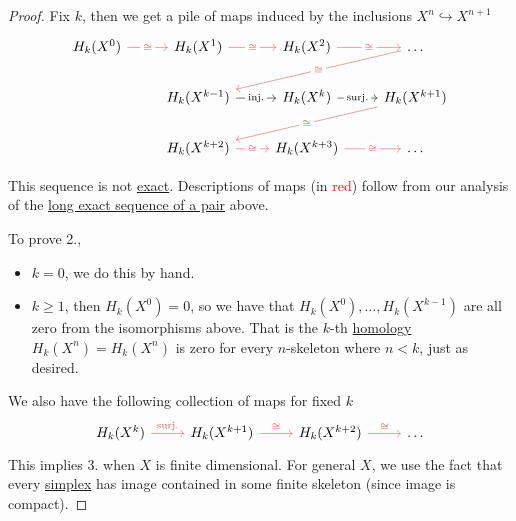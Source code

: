 \begin{proof}
	Fix \(k\), then we get a pile of maps induced by the inclusions \(X^n \hookrightarrow X^{n + 1}\)
	\[
		\begin{tikzcd}
			{H_k(X^0)} & {H_k(X^1)} & {H_k(X^2)} & \ldots \\
			& {H_k(X^{k-1})} & {H_k(X^{k})} & {H_k(X^{k+1})} \\
			& {H_k(X^{k+2})} & {H_k(X^{k+3})} & \ldots
			\arrow["\cong"{description}, color={rgb,255:red,214;green,92;blue,92}, from=1-4, to=2-2]
			\arrow["{\text{inj.}}"{description}, from=2-2, to=2-3]
			\arrow["{\text{surj.}}"{description}, from=2-3, to=2-4]
			\arrow["\cong"{description}, color={rgb,255:red,214;green,92;blue,92}, from=2-4, to=3-2]
			\arrow["\cong"{description}, color={rgb,255:red,214;green,92;blue,92}, from=3-2, to=3-3]
			\arrow["\cong"{description}, color={rgb,255:red,214;green,92;blue,92}, from=3-3, to=3-4]
			\arrow["\cong"{description}, color={rgb,255:red,214;green,92;blue,92}, from=1-1, to=1-2]
			\arrow["\cong"{description}, color={rgb,255:red,214;green,92;blue,92}, from=1-2, to=1-3]
			\arrow["\cong"{description}, color={rgb,255:red,214;green,92;blue,92}, from=1-3, to=1-4]
		\end{tikzcd}
	\]
	\begin{note}
		This sequence is not \hyperref[def:exact-sequence]{exact}. Descriptions of maps (in \textcolor{red}{red}) follow
		from our analysis of the \hyperref[thm:long-exact-sequence-of-a-pair]{long exact sequence of a pair} above.
	\end{note}

	To prove 2.,
	\begin{itemize}
		\item \(k = 0\), we do this by hand.
		\item \(k \geq 1\), then \(H_k(X^0) = 0\), so we have that \(H_k(X^0), \ldots, H_k(X^{k - 1})\) are all zero from the
		      isomorphisms above. That is the \(k\)-th \hyperref[def:singular-homology-group]{homology} \(H_k(X^n) = H_k(X^n)\)
		      is zero for every \(n\)-skeleton where \(n < k\), just as desired.
	\end{itemize}
	We also have the following collection of maps for fixed \(k\)
	\[
		\begin{tikzcd}
			{H_k(X^k)} & {H_k(X^{k+1})} & {H_k(X^{k+2})} & \ldots
			\arrow["{\text{surj.}}", color={rgb,255:red,214;green,92;blue,92}, from=1-1, to=1-2]
			\arrow["\cong", color={rgb,255:red,214;green,92;blue,92}, from=1-2, to=1-3]
			\arrow["\cong", color={rgb,255:red,214;green,92;blue,92}, from=1-3, to=1-4]
		\end{tikzcd}
	\]
	This implies 3. when \(X\) is finite dimensional. For general \(X\), we use the fact that every \hyperref[def:standard-simplex]{simplex}
	has image contained in some finite skeleton (since image is compact).
\end{proof}

